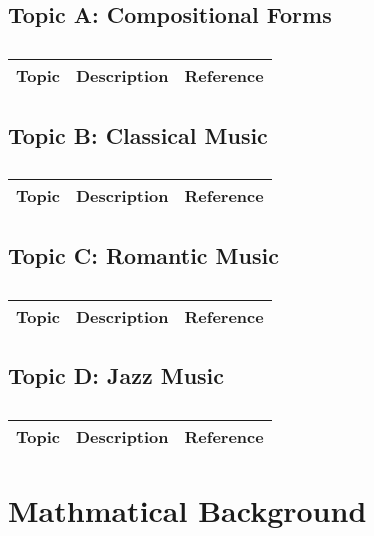 \subsection{Topic A: Compositional Forms}

\centering	
\begin{table}[H]\tiny
	\caption{}	
	\begin{tabular}{r|p{4cm}|l}
		\hline	
		Topic & Description & Reference \\
		\hline 
		\hline 
	\end{tabular}
\end{table}

\subsection{Topic B: Classical Music}

\centering	
\begin{table}[H]\tiny
	\caption{}	
	\begin{tabular}{r|p{4cm}|l}
		\hline	
		Topic & Description & Reference \\
		\hline 
		\hline 
	\end{tabular}
\end{table}

\subsection{Topic C: Romantic Music}

\centering	
\begin{table}[H]\tiny
	\caption{}	
	\begin{tabular}{r|p{4cm}|l}
		\hline	
		Topic & Description & Reference \\
		\hline 
		\hline 
	\end{tabular}
\end{table}

\subsection{Topic D: Jazz Music}

\centering	
\begin{table}[H]\tiny
	\caption{}	
	\begin{tabular}{r|p{4cm}|l}
		\hline	
		Topic & Description & Reference \\
		\hline 
		\hline 
	\end{tabular}
\end{table}

\section{Mathmatical Background}

